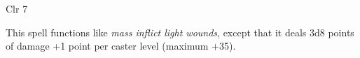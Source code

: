 
\begin{description*}
\item[Level:] Clr 7
\end{description*}

This spell functions like \textit{mass inflict light wounds}, except that it deals
3d8 points of damage +1 point per caster level (maximum +35).